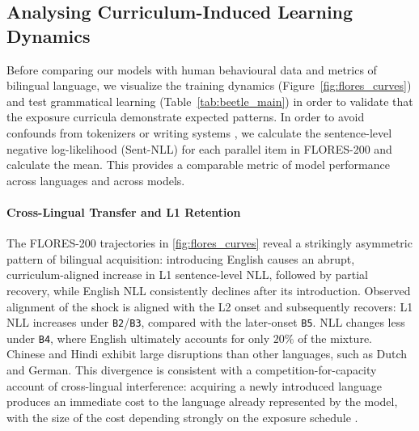 \documentclass[11pt]{article}
\begin{document}
\subsection{Analysing Curriculum-Induced Learning Dynamics}\label{sec:sanity-checks}

Before comparing our models with human behavioural data and metrics of bilingual language, we visualize the training dynamics (Figure~\ref{fig:flores_curves}) and test grammatical learning (Table~\ref{tab:beetle_main}) in order to validate that the exposure curricula demonstrate expected patterns. In order to avoid confounds from tokenizers or writing systems \citep{yang2026applesapplescomparablecrosslingual}, we calculate the sentence-level negative log-likelihood (Sent-NLL) for each parallel item in FLORES-200 and calculate the mean. This provides a comparable metric of model performance across languages and across models.


\paragraph{Cross-Lingual Transfer and L1 Retention} The FLORES-200 trajectories in \autoref{fig:flores_curves} reveal a strikingly asymmetric pattern of bilingual acquisition: introducing English causes an abrupt, curriculum-aligned increase in L1 sentence-level NLL, followed by partial recovery, while English NLL consistently declines after its introduction. Observed alignment of the shock is aligned with the L2 onset and subsequently recovers: L1 NLL increases under \texttt{B2}/\texttt{B3}, compared with the later-onset \texttt{B5}. NLL changes less under \texttt{B4}, where English ultimately accounts for only $20\%$ of the mixture. Chinese and Hindi exhibit large disruptions than other languages, such as Dutch and German. %
This divergence is consistent with a competition-for-capacity account of cross-lingual interference: acquiring a newly introduced language produces an immediate cost to the language already represented by the model, with the size of the cost depending strongly on the exposure schedule \citep{whitford2015second}.

\end{document}
